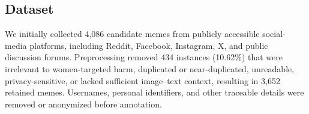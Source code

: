 \documentclass[11pt]{article}
\begin{document}














\subsection{Dataset}
\label{subsec:dataset}

We initially collected 4,086 candidate memes from publicly accessible
social-media platforms, including Reddit, Facebook, Instagram, X,
and public discussion forums. Preprocessing removed 434 instances
(10.62\%) that were irrelevant to women-targeted harm, duplicated or
near-duplicated, unreadable, privacy-sensitive, or lacked sufficient
image--text context, resulting in 3,652 retained memes. Usernames,
personal identifiers, and other traceable details were removed or
anonymized before annotation.
\end{document}
